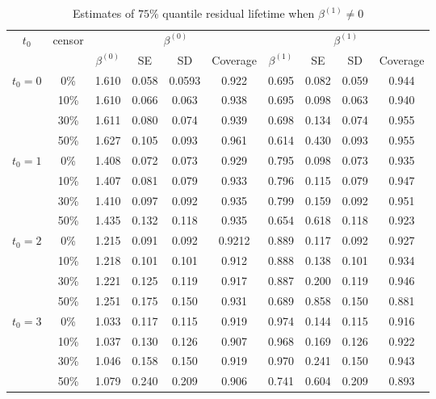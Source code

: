 \documentclass[12pt]{article}
\begin{document}
	\begin{table}[H]
		\caption{Estimates of $75\%$ quantile residual lifetime when $\beta^{(1)} \neq 0$}
		\centering
		\begin{tabular}{|c|c|c|c|c|c|c|c|c|c|}
			\hline
			\multirow{2}{*}{$t_0$} & \multirow{2}{*}{censor} & \multicolumn{4}{c|}{$\beta^{(0)}$} & \multicolumn{4}{c|}{$\beta^{(1)}$}\\ \cline{3-10}
			& & $\beta^{(0)}$ & SE & SD  & Coverage  & $\beta^{(1)}$ & SE & SD & Coverage\\
			\hline\hline
			\multirow{4}{*}{$t_0=0$} & 0\% & 1.610 & 0.058 & 0.0593 & 0.922 & 0.695 & 0.082 & 0.059 & 0.944 \\
			& 10\% & 1.610 & 0.066 & 0.063 & 0.938 & 0.695 & 0.098 & 0.063 & 0.940 \\
			& 30\% & 1.611 & 0.080 & 0.074 & 0.939 & 0.698 & 0.134 & 0.074 & 0.955 \\
			& 50\% & 1.627 & 0.105 & 0.093 & 0.961 & 0.614 & 0.430 & 0.093 & 0.955 \\
			\hline
			\multirow{4}{*}{$t_0=1$} & 0\% & 1.408 & 0.072 & 0.073 & 0.929 & 0.795 & 0.098 & 0.073 & 0.935 \\
			& 10\% & 1.407 & 0.081 & 0.079 & 0.933 & 0.796 & 0.115 & 0.079 & 0.947 \\
			& 30\% & 1.410 & 0.097 & 0.092 & 0.935 & 0.799 & 0.159 & 0.092 & 0.951 \\
			& 50\% & 1.435 & 0.132 & 0.118 & 0.935 & 0.654 & 0.618 & 0.118 & 0.923 \\
			\hline
			\multirow{4}{*}{$t_0=2$} & 0\% & 1.215 & 0.091 & 0.092 & 0.9212 & 0.889 & 0.117 & 0.092 & 0.927 \\
			& 10\% & 1.218 & 0.101 & 0.101 & 0.912 & 0.888 & 0.138 & 0.101 & 0.934 \\
			& 30\% & 1.221 & 0.125 & 0.119 & 0.917 & 0.887 & 0.200 & 0.119 & 0.946 \\
			& 50\% & 1.251 & 0.175 & 0.150 & 0.931 & 0.689 & 0.858 & 0.150 & 0.881 \\
			\hline
			\multirow{4}{*}{$t_0=3$} & 0\% & 1.033 & 0.117 & 0.115 & 0.919 & 0.974 & 0.144 & 0.115 & 0.916 \\
			& 10\% & 1.037 & 0.130 & 0.126 & 0.907 & 0.968 & 0.169 & 0.126 & 0.922 \\
			& 30\% & 1.046 & 0.158 & 0.150 & 0.919 & 0.970 & 0.241 & 0.150 & 0.943 \\
			& 50\% & 1.079 & 0.240 & 0.209 & 0.906 & 0.741 & 0.604 & 0.209 & 0.893 \\	
			\hline
		\end{tabular}
	\end{table}
\end{document}

